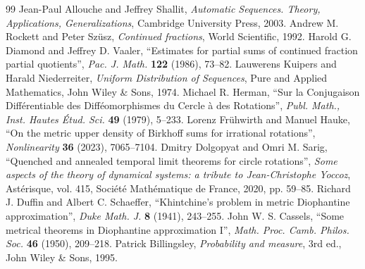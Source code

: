 \documentclass[10pt,a4paper]{amsart}
\numberwithin{equation}{section}
\theoremstyle{definition}
\begin{document}
\begin{thebibliography}{99}
 Jean-Paul Allouche and Jeffrey Shallit, \emph{Automatic Sequences. Theory, Applications, Generalizations}, Cambridge University Press, 2003.
 Andrew M. Rockett and Peter Sz\"usz, \emph{Continued fractions}, World Scientific, 1992.
 Harold G. Diamond and Jeffrey D. Vaaler, ``Estimates for partial sums of continued fraction partial quotients'', \emph{Pac. J. Math.} \textbf{122} (1986), 73--82.
 Lauwerens Kuipers and Harald Niederreiter, \emph{Uniform Distribution of Sequences}, Pure and Applied Mathematics, John Wiley \& Sons, 1974.
 Michael R. Herman, ``Sur la Conjugaison Diff\'erentiable des Diff\'eomorphismes du Cercle \`a des Rotations'', \emph{Publ. Math., Inst. Hautes \'Etud. Sci.} \textbf{49} (1979), 5--233.
 Lorenz Fr\"uhwirth and Manuel Hauke, ``On the metric upper density of Birkhoff sums for irrational rotations'', \emph{Nonlinearity} \textbf{36} (2023), 7065--7104.
 Dmitry Dolgopyat and Omri M. Sarig, ``Quenched and annealed temporal limit theorems for circle rotations'', \emph{Some aspects of the theory of dynamical systems: a tribute to Jean-Christophe Yoccoz}, Ast\'erisque, vol. 415, Soci\'et\'e Math\'ematique de France, 2020, pp. 59--85.
 Richard J. Duffin and Albert C. Schaeffer, ``Khintchine's problem in metric Diophantine approximation'', \emph{Duke Math. J.} \textbf{8} (1941), 243--255.
 John W. S. Cassels, ``Some metrical theorems in Diophantine approximation I'', \emph{Math. Proc. Camb. Philos. Soc.} \textbf{46} (1950), 209--218.
 Patrick Billingsley, \emph{Probability and measure}, 3rd ed., John Wiley \& Sons, 1995.
\end{thebibliography}
\end{document}
